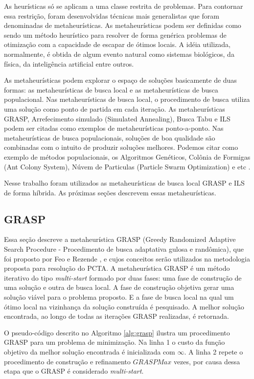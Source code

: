 As heurísticas só se aplicam a uma classe restrita de problemas. Para contornar essa restrição, foram desenvolvidas técnicas mais generalistas que foram denominadas de metaheurísticas. As metaheurísticas podem ser definidas como sendo um método heurístico para resolver de forma genérica problemas de otimização com a capacidade de escapar de ótimos locais. A idéia utilizada, normalmente, é obtida de algum evento natural como sistemas biológicos, da física, da inteligência artificial entre outros.

As metaheurísticas podem explorar o espaço de soluções basicamente de duas formas: as metaheurísticas de busca local e as metaheurísticas de busca populacional. Nas metaheurísticas de busca local, o procedimento de busca utiliza uma solução como ponto de partida em cada iteração. As metaheurísticas GRASP, Arrefecimento simulado (Simulated Annealing), Busca Tabu e ILS podem ser citadas como exemplos de metaheurísticas ponto-a-ponto. Nas metaheurísticas de busca populacionais, soluções de boa qualidade são combinadas com o intuito de produzir soluções melhores. Podemos citar como exemplo de métodos populacionais, os Algoritmos Genéticos, Colônia de Formigas (Ant Colony System), Núvem de Particulas (Particle Swarm Optimization) e etc \cite{maritan2009}.

Nesse trabalho foram utilizados as metaheurísticas de busca local GRASP e ILS de forma híbrida. As próximas seções descrevem essas metaheurísticas.

\subsection{GRASP}

Essa seção descreve a metaheurística GRASP (Greedy Randomized Adaptive Search Procedure - Procedimento de busca adaptativa gulosa e randômica), que foi proposto por Feo e Rezende \cite{resende1995}, e cujos conceitos serão utilizados na metodologia proposta para resolução do PCTA.
A metaheurística GRASP é um método iterativo do tipo \textit{multi-start} formado por duas fases: uma fase de construção de uma solução e outra de busca local. A fase de construção objetiva gerar uma solução viável para o problema proposto. E a fase de busca local na qual um ótimo local na vizinhança da solução construída é pesquisado. A melhor solução encontrada, ao longo de todas as iterações GRASP realizadas, é retornada.

O pseudo-código descrito no Algoritmo \ref{alg:grasp} ilustra um procedimento GRASP para um problema de minimização. Na linha 1 o custo da função objetivo da melhor solução encontrada é inicializada com $\infty$. A linha 2 repete o procedimento de construção e refinamento $GRASPMax$ vezes, por causa dessa etapa que o GRASP é considerado \textit{multi-start}.

